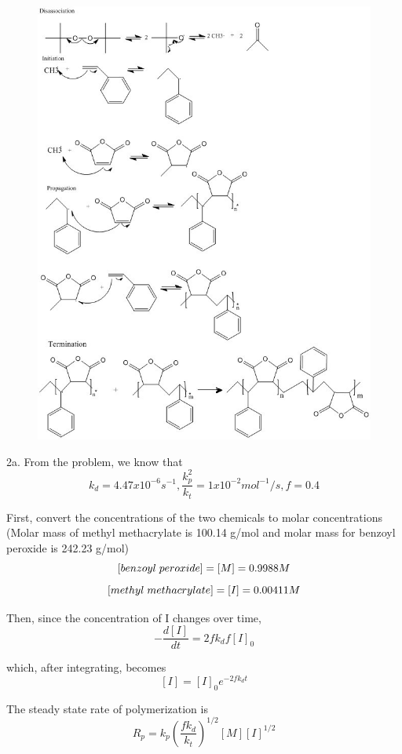 \documentclass{article}
\begin{document}
\begin{figure}[h]
  \centering
 \includegraphics[scale=0.7]{P1b.jpg}
\end{figure}

2a. From the problem, we know that
$$k_d=4.47x10^{-6} s^{-1},\frac{k_p^2}{k_t}=1x10^{-2} mol^{-1}/s, f=0.4$$

First, convert the concentrations of the two chemicals to molar concentrations (Molar mass of methyl methacrylate is 100.14 g/mol and molar mass for benzoyl peroxide is 242.23 g/mol)
$$[benzoyl\hspace{1mm} peroxide]=[M]=0.9988 M$$
$$[methyl\hspace{1mm} methacrylate]=[I]=0.00411 M$$

Then, since the concentration of I changes over time,
$$-\frac{d[I]}{dt}=2fk_df[I]_0$$

which, after integrating, becomes
$$[I]=[I]_0e^{-2fk_dt}$$

The steady state rate of polymerization is
$$R_p=k_p\left(\frac{fk_d}{k_t}\right)^{1/2}[M][I]^{1/2}$$
\end{document}
